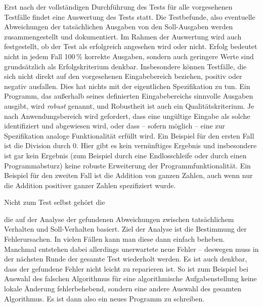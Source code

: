 Erst nach der vollständigen Durchführung des Tests 
für alle vorgesehenen Testfälle findet eine Auswertung des Tests statt. Die Testbefunde, also eventuelle Abweichungen der tatsächlichen Ausgaben von den Soll-Ausgaben werden zusammengestellt und dokumentiert. Im Rahmen der Auswertung wird auch festgestellt, ob der Test als erfolgreich angesehen wird oder nicht. Erfolg bedeutet nicht in jedem Fall 100\,\% korrekte Ausgaben, sondern auch geringere Werte sind grundsätzlich als Erfolgs\-kriterium denkbar. Insbesondere können Testfälle, die sich nicht direkt auf den vorgesehenen Eingabebereich beziehen, positiv oder negativ ausfallen. Dies hat nichts mit der eigentlichen Spezifikation zu tun. Ein Programm, das außerhalb seines definierten Eingabebereichs sinnvolle Ausgaben ausgibt, wird \textit{robust} genannt, und Robustheit 
ist auch ein Qualitätskriterium. Je nach Anwendungsbereich wird gefordert, dass eine ungültige Eingabe als solche identifiziert und abgewiesen wird, oder dass -- sofern möglich -- eine zur Spezifikation analoge Funktionalität erfüllt wird. Ein Beispiel für den ersten Fall ist die Division durch 0. Hier gibt es kein vernünftiges Ergebnis und insbesondere ist gar kein Ergebnis (zum Beispiel durch eine Endlosschleife oder durch einen Programmabsturz) keine robuste Erweiterung der Programmfunktionalität. Ein Beispiel für den zweiten Fall ist die Addition von ganzen Zahlen, auch wenn nur die Addition positiver ganzer Zahlen spezifiziert wurde. 

\vspace{\baselineskip}

Nicht zum Test selbst gehört die


die auf der Analyse der gefundenen Abweichungen zwischen tatsächlichem Verhalten und Soll-Verhalten basiert. Ziel der Analyse ist die Bestimmung der Fehlerursachen. In vielen Fällen kann man diese dann einfach beheben. Manchmal entstehen dabei allerdings unerwartete neue Fehler -- deswegen muss in der nächsten Runde der gesamte Test wiederholt werden. Es ist auch denkbar, dass der gefundene Fehler nicht leicht zu reparieren ist. So ist zum Beispiel bei Auswahl des falschen Algorithmus für eine algorithmische Aufgabenstellung keine lokale Änderung fehlerbehebend, sondern eine andere Auswahl des gesamten Algorithmus. Es ist dann also ein neues Programm zu schreiben.
